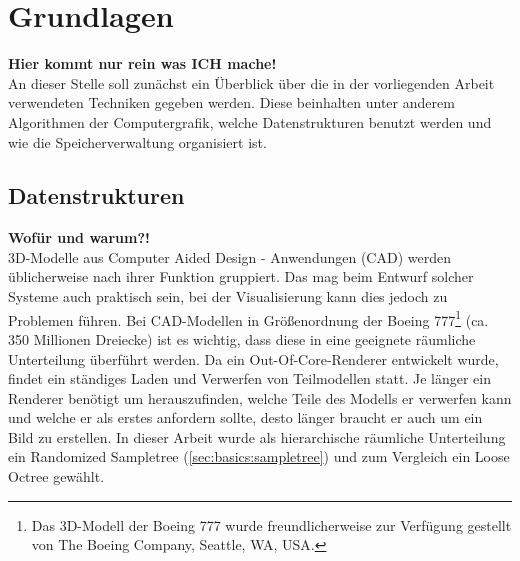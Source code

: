 \chapter{Grundlagen}
\label{chap:basics}
%
\textbf{Hier kommt nur rein was ICH mache!}\\
An dieser Stelle soll zunächst ein Überblick über die in der vorliegenden Arbeit verwendeten Techniken gegeben werden. Diese beinhalten unter anderem Algorithmen der Computergrafik, welche Datenstrukturen benutzt werden und wie die Speicherverwaltung organisiert ist.

\section{Datenstrukturen}
\label{sec:basics:datenstrukturen}
\textbf{Wofür und warum?!}\\
3D-Modelle aus Computer Aided Design - Anwendungen (CAD) werden üblicherweise nach ihrer Funktion gruppiert. Das mag beim Entwurf solcher Systeme auch praktisch sein, bei der Visualisierung kann dies jedoch zu Problemen führen. Bei CAD-Modellen in Größenordnung der Boeing 777\footnote{%
Das 3D-Modell der Boeing 777 wurde freundlicherweise zur Verfügung gestellt von The Boeing Company, Seattle, WA, USA.} (ca. 350 Millionen Dreiecke) ist es wichtig, dass diese in eine geeignete räumliche Unterteilung überführt werden. Da ein Out-Of-Core-Renderer entwickelt wurde, findet ein ständiges Laden und Verwerfen von Teilmodellen statt. Je länger ein Renderer benötigt um herauszufinden, welche Teile des Modells er verwerfen kann und welche er als erstes anfordern sollte, desto länger braucht er auch um ein Bild zu erstellen. In dieser Arbeit wurde als hierarchische räumliche Unterteilung ein Randomized Sampletree (\ref{sec:basics:sampletree}) und zum Vergleich ein Loose Octree gewählt.

